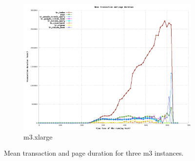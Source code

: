 \documentclass[dvips,12pt]{article}
\begin{document}
\begin{figure}[h!]
\begin{subfigure}[b]{0.3\textwidth}
        \includegraphics[width=\textwidth]{images/vertical/transaction_xlarge.png}
        \caption{m3.xlarge}
    \end{subfigure}
    \caption{Mean transaction and page duration for three m3 instances.}
\end{figure}
\end{document}
